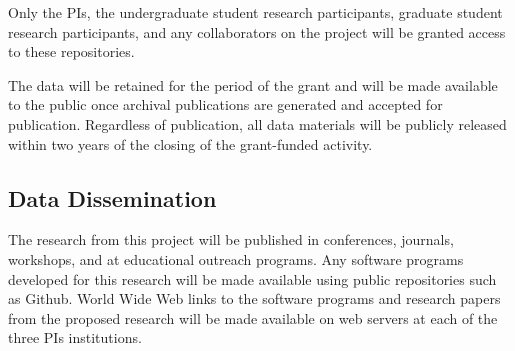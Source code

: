 \documentclass[11pt]{article}
\begin{document}
    Only the PIs, the undergraduate student research participants, graduate student research participants, and any collaborators on the project will be granted access to these repositories.
    
    The data will be retained for the period of the grant and will be made available to the public once archival publications are generated and accepted for publication.  Regardless of publication, all data materials will be publicly released within two years of the closing of the grant-funded activity.
    
    \subsection*{Data Dissemination}
    The research from this project will be published in conferences, journals, workshops, and at educational outreach programs. 
    Any software programs developed for this research will be made available using public repositories such as Github.
    World Wide Web links to the software programs and research papers from the proposed research will be made available on web servers at each of the three PIs institutions. 
    
\end{document}

